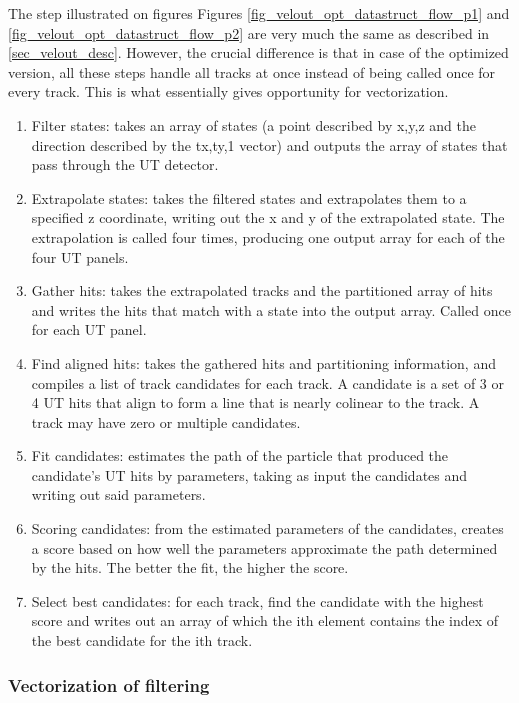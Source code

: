 \documentclass[12pt]{article}
\begin{document}
The step illustrated on figures Figures \ref{fig_velout_opt_datastruct_flow_p1} and \ref{fig_velout_opt_datastruct_flow_p2} are very much the same as described in \ref{sec_velout_desc}. However, the crucial difference is that in case of the optimized version, all these steps handle all tracks at once instead of being called once for every track. This is what essentially gives opportunity for vectorization.

\begin{enumerate}
	\item Filter states: takes an array of states (a point described by x,y,z and the direction described by the tx,ty,1 vector) and outputs the array of states that pass through the UT detector.
	\item Extrapolate states: takes the filtered states and extrapolates them to a specified z coordinate, writing out the x and y of the extrapolated state. The extrapolation is called four times, producing one output array for each of the four UT panels.
	\item Gather hits: takes the extrapolated tracks and the partitioned array of hits and writes the hits that match with a state into the output array. Called once for each UT panel.
	\item Find aligned hits: takes the gathered hits and partitioning information, and compiles a list of track candidates for each track. A candidate is a set of 3 or 4 UT hits that align to form a line that is nearly colinear to the track. A track may have zero or multiple candidates.
	\item Fit candidates: estimates the path of the particle that produced the candidate's UT hits by parameters, taking as input the candidates and writing out said parameters.
	\item Scoring candidates: from the estimated parameters of the candidates, creates a score based on how well the parameters approximate the path determined by the hits. The better the fit, the higher the score.
	\item Select best candidates: for each track, find the candidate with the highest score and writes out an array of which the ith element contains the index of the best candidate for the ith track.
\end{enumerate}


\subsubsection{Vectorization of filtering}\label{sec_velout_filtering_vect}
\end{document}
